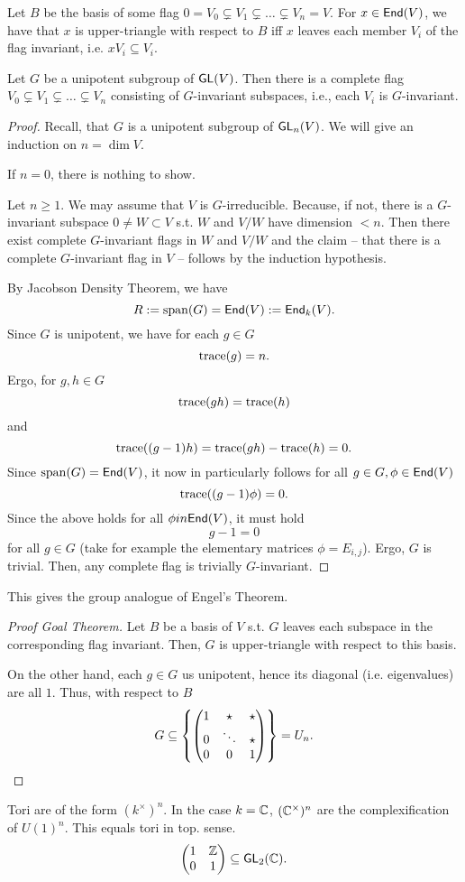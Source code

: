 Let $B$ be the basis of some flag $0 = V_0 \subsetneq V_1 \subsetneq \ldots \subsetneq V_n = V$.
For $x \in \textsf{End}(V)$, we have that $x$ is upper-triangle with respect to $B$ iff $x$ leaves each member $V_i$ of the flag invariant, i.e. $xV_i \subseteq V_i.$

\begin{proposition}
	Let $G$ be a unipotent subgroup of $\textsf{GL}(V)$. Then there is a complete flag $ V_0 \subsetneq V_1 \subsetneq \ldots \subsetneq V_n$ consisting of $G$-invariant subspaces, i.e., each $V_i$ is $G$-invariant.
\end{proposition}
\begin{proof}
Recall, that $G$ is a unipotent subgroup of $\textsf{GL}_n(V)$. We will give an induction on $n = \dim V$.

If $n = 0$, there is nothing to show.

Let $n \geq 1$. We may assume that $V$ is $G$-irreducible. Because, if not, there is a $G$-invariant subspace $0\neq W \subset V$ s.t. $W$ and $V/W$ have dimension $< n$. Then there exist complete $G$-invariant flags in $W$ and $V/W$ and the claim -- that there is a complete $G$-invariant flag in $V$ -- follows by the induction hypothesis.

By Jacobson Density Theorem, we have
\[ R := \mathrm{span}(G) = \textsf{End}(V) := \textsf{End}_k(V). \]
Since $G$ is unipotent, we have for each $g \in G$
\[ \mathrm{trace}(g) = n.\]
Ergo, for $g,h \in G$
\[ \mathrm{trace}(gh) = \mathrm{trace}(h) \]
and
\[ \mathrm{trace}((g-1)h) = \mathrm{trace}(gh) - \mathrm{trace}(h) = 0. \]
Since $\mathrm{span}(G) = \textsf{End}(V)$, it now in particularly follows for all $g \in G, \phi \in \textsf{End}(V)$
\[ \mathrm{trace}((g-1) \phi) = 0. \]
Since the above holds for all $\phi in \textsf{End}(V)$, it must hold
\[ g-1 = 0 \]
for all $g \in G$ (take for example the elementary matrices $\phi = E_{i,j}$). Ergo, $G$ is trivial. Then, any complete flag is trivially $G$-invariant.
\end{proof}
\begin{remark}
	This gives the group analogue of Engel's Theorem.
\end{remark}
\begin{proof}[Proof Goal Theorem]
	Let $B$ be a basis of $V$ s.t. $G$ leaves each subspace in the corresponding flag invariant. Then, $G$ is upper-triangle with respect to this basis.
	
	On the other hand, each $g \in G$ us unipotent, hence its diagonal (i.e. eigenvalues) are all $1$. Thus, with respect to $B$
	\[ G \subseteq \left\lbrace
	\left(\begin{matrix} 1 & \star & \star\\ 0 & \ddots & \star \\ 0 & 0 & 1 \end{matrix}\right)\right\rbrace = U_n.\]
\end{proof}
\begin{remark}
	Tori are of the form $(k^\times)^n$. In the case $k = \mathbb{C}$, $(\mathbb{C}^\times)^n$ are the complexification of $U(1)^n$. This equals tori in top. sense.
	\[
	\left(\begin{matrix} 1 & \mathbb{Z} \\ 0 & 1 \end{matrix}\right) \subseteq \textsf{GL}_2(\mathbb{C}).
	 \]
\end{remark}